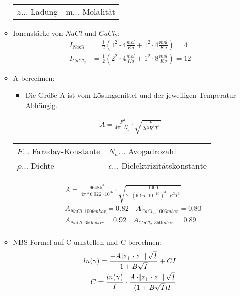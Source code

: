 \begin{enumerate}
\begin{itemize}
\begin{table}[H]
			            \begin{tabular}{ll}
				            $z$... Ladung & m... Molalität \\
			            \end{tabular}
		            \end{table}
		      \item Ionenstärke von $NaCl$ und $CaCl_2$:
		            \begin{align*}
			            I_{NaCl}   & = \frac{1}{2} (1^2 \cdot 4 \frac{mol}{Kg} + 1^2 \cdot 4 \frac{mol}{Kg}) = 4  \\
			            I_{CaCl_2} & = \frac{1}{2} (2^2 \cdot 4 \frac{mol}{Kg} + 1^2 \cdot 8 \frac{mol}{Kg}) = 12
		            \end{align*}
		      \item A berechnen:
		            \begin{itemize}
			            \item Die Größe A ist vom Lösungsmittel und der jeweiligen Temperatur Abhängig.
		            \end{itemize}
		            \begin{align*}
			            A = \frac{F^3}{4 \pi \cdot N_a} \cdot \sqrt{ \frac{\rho} {2 \epsilon^3 R^3 T^3}}
		            \end{align*}
		            \begin{table}[H]
			            \centering
			            \begin{tabular}{ll}
				            $F$... Faraday-Konstante & $N_a$... Avogadrozahl                  \\
				            $\rho$... Dichte         & $\epsilon$... Dielektrizitätskonstante
			            \end{tabular}
		            \end{table}
		            \begin{align*}
			             & A = \frac{96485^3}{4 \pi * 6.022 \cdot 10^{26}} \cdot
			            \sqrt{ \frac{1000}{2 \cdot (6.95 \cdot 10^{-10})^3 \cdot R^3 T^3}} \\
			             & A_{NaCl, 1006mbar} = 0.82 \quad A_{CaCl_2, 1006mbar} = 0.80     \\
			             & A_{NaCl, 350mbar} = 0.92  \quad A_{CaCl_2, 350mbar} = 0.89      \\
		            \end{align*}
		      \item NBS-Formel auf C umstellen und C berechnen:
		            \begin{align*}
			            ln(\gamma) = \frac{-A \abs{z_+ \cdot z_-} \sqrt{I}} {1 + B \sqrt{I}} + CI \\
			            C = \frac{ln(\gamma)}{I} \cdot \frac{A \cdot \abs{z_+ \cdot z_-} \sqrt{I}}
			            {(1+B\sqrt{I})I}
		            \end{align*}


\end{itemize}
\end{enumerate}
